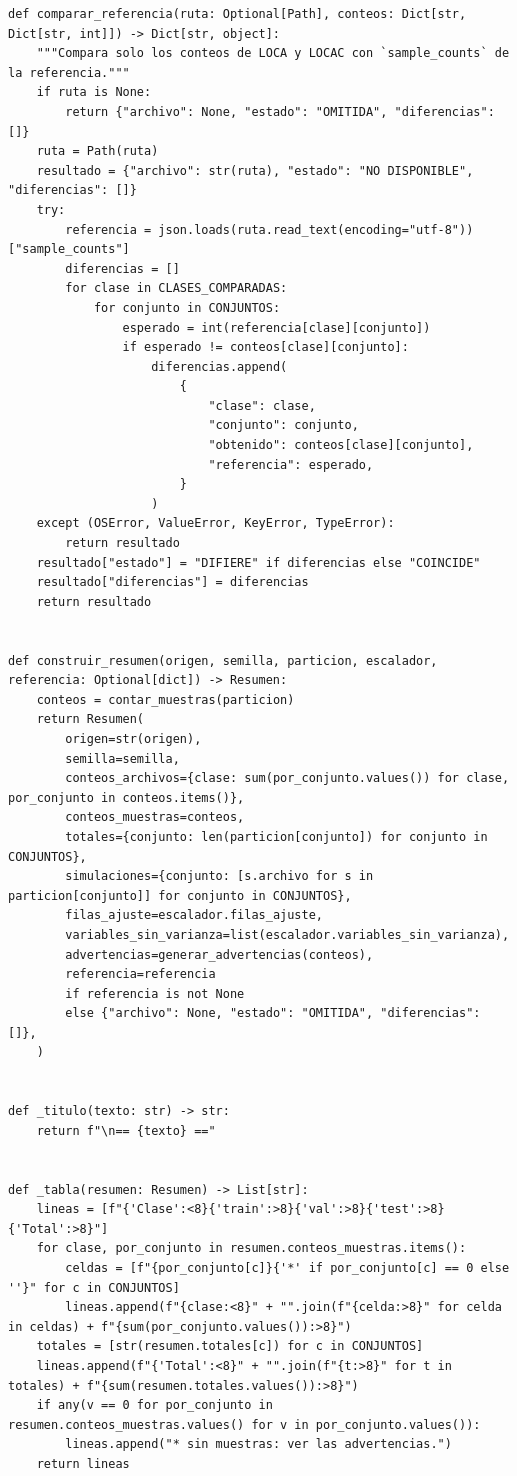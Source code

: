 \documentclass[12pt,a4paper]{article}
\begin{document}
\begin{lstlisting}
def comparar_referencia(ruta: Optional[Path], conteos: Dict[str, Dict[str, int]]) -> Dict[str, object]:
    """Compara solo los conteos de LOCA y LOCAC con `sample_counts` de la referencia."""
    if ruta is None:
        return {"archivo": None, "estado": "OMITIDA", "diferencias": []}
    ruta = Path(ruta)
    resultado = {"archivo": str(ruta), "estado": "NO DISPONIBLE", "diferencias": []}
    try:
        referencia = json.loads(ruta.read_text(encoding="utf-8"))["sample_counts"]
        diferencias = []
        for clase in CLASES_COMPARADAS:
            for conjunto in CONJUNTOS:
                esperado = int(referencia[clase][conjunto])
                if esperado != conteos[clase][conjunto]:
                    diferencias.append(
                        {
                            "clase": clase,
                            "conjunto": conjunto,
                            "obtenido": conteos[clase][conjunto],
                            "referencia": esperado,
                        }
                    )
    except (OSError, ValueError, KeyError, TypeError):
        return resultado
    resultado["estado"] = "DIFIERE" if diferencias else "COINCIDE"
    resultado["diferencias"] = diferencias
    return resultado


def construir_resumen(origen, semilla, particion, escalador, referencia: Optional[dict]) -> Resumen:
    conteos = contar_muestras(particion)
    return Resumen(
        origen=str(origen),
        semilla=semilla,
        conteos_archivos={clase: sum(por_conjunto.values()) for clase, por_conjunto in conteos.items()},
        conteos_muestras=conteos,
        totales={conjunto: len(particion[conjunto]) for conjunto in CONJUNTOS},
        simulaciones={conjunto: [s.archivo for s in particion[conjunto]] for conjunto in CONJUNTOS},
        filas_ajuste=escalador.filas_ajuste,
        variables_sin_varianza=list(escalador.variables_sin_varianza),
        advertencias=generar_advertencias(conteos),
        referencia=referencia
        if referencia is not None
        else {"archivo": None, "estado": "OMITIDA", "diferencias": []},
    )


def _titulo(texto: str) -> str:
    return f"\n== {texto} =="


def _tabla(resumen: Resumen) -> List[str]:
    lineas = [f"{'Clase':<8}{'train':>8}{'val':>8}{'test':>8}{'Total':>8}"]
    for clase, por_conjunto in resumen.conteos_muestras.items():
        celdas = [f"{por_conjunto[c]}{'*' if por_conjunto[c] == 0 else ''}" for c in CONJUNTOS]
        lineas.append(f"{clase:<8}" + "".join(f"{celda:>8}" for celda in celdas) + f"{sum(por_conjunto.values()):>8}")
    totales = [str(resumen.totales[c]) for c in CONJUNTOS]
    lineas.append(f"{'Total':<8}" + "".join(f"{t:>8}" for t in totales) + f"{sum(resumen.totales.values()):>8}")
    if any(v == 0 for por_conjunto in resumen.conteos_muestras.values() for v in por_conjunto.values()):
        lineas.append("* sin muestras: ver las advertencias.")
    return lineas



\end{lstlisting}
\end{document}
